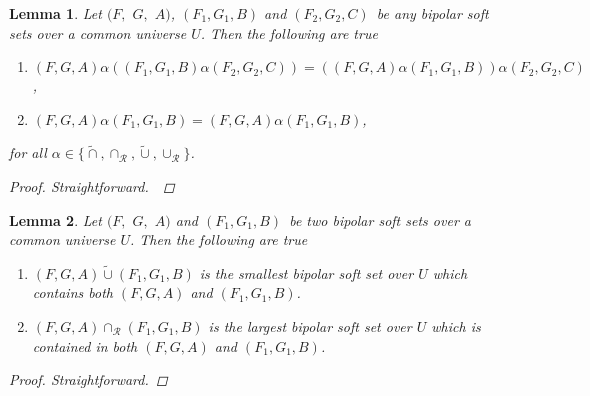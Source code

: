 \documentclass{amsart}
\theoremstyle{plain}
\newtheorem{lemma}{Lemma}
\numberwithin{equation}{section}
\begin{document}
\begin{lemma}
Let $(F,$ $G,$ $A)$, $(F_{1},G_{1},B)$ and $(F_{2},G_{2},C)$\ be any \textit{bipolar soft set}s over a common universe $U$. Then the following are true

\begin{enumerate}
\item $(F,G,A)\alpha ((F_{1},G_{1},B)\alpha (F_{2},G_{2},C))=((F,G,A)\alpha
(F_{1},G_{1},B))\alpha (F_{2},G_{2},C)$,

\item $(F,G,A)\alpha (F_{1},G_{1},B)=(F,G,A)\alpha (F_{1},G_{1},B)$,
\end{enumerate}

for all $\alpha \in \{\tilde{\cap},\cap _{\mathcal{R}},\tilde{\cup},\cup _{\mathcal{R}}\}$.

\begin{proof}
Straightforward.\ 
\end{proof}
\end{lemma}

\begin{lemma}
Let $(F,$ $G,$ $A)$ and $(F_{1},G_{1},B)$\ be two \textit{bipolar soft set}s
over a common universe $U$. Then the following are true

\begin{enumerate}
\item $(F,G,A)\tilde{\cup}(F_{1},G_{1},B)$ is the smallest \textit{bipolar}
soft set over $U$ which contains both $(F,G,A)$ and $(F_{1},G_{1},B)$.

\item $(F,G,A)\cap _{\mathcal{R}}(F_{1},G_{1},B)$ is the largest \textit{bipolar} soft set over $U$ which is contained in both $(F,G,A)$ and $(F_{1},G_{1},B)$.
\end{enumerate}

\begin{proof}
Straightforward.
\end{proof}
\end{lemma}
\end{document}
